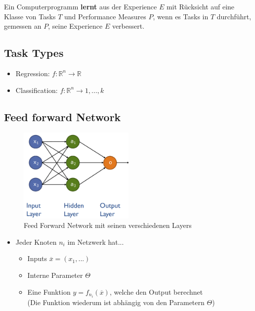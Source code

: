 \documentclass[a4paper]{article}
\begin{document}
		Ein Computerprogramm \textbf{lernt} aus der Experience $E$ mit Rücksicht auf eine Klasse von Tasks $T$ und Performance Measures $P$, wenn es Tasks in $T$ durchführt, gemessen an $P$, seine Experience $E$ verbessert.
		
		\subsection{Task Types}
		
		\begin{itemize}
			\item Regression: $f : \mathbb{R}^{n} \rightarrow \mathbb{R}$ \\
			\item Classification: $f : \mathbb{R}^{n} \rightarrow {1,...,k}$
		\end{itemize}
	
		\subsection{Feed forward Network}
		
		\begin{figure}[htb!]
			\centering
			\includegraphics[width=0.5\textwidth]{img/05_neuronal_networks/feed_forward_network.png}
			\caption{Feed Forward Network mit seinen verschiedenen Layers}
			\label{fig:05_neuronet_ff_network}
		\end{figure}
	
		\begin{itemize}
			\item Jeder Knoten $n_{i}$ im Netzwerk hat...
				\begin{itemize}
					\item Inputs $\overline{x} = (x_{1}, ...)$
					\item Interne Parameter $\Theta$
					\item Eine Funktion $y = f_{n_{i}}(\overline{x})$, welche den Output berechnet \\
					(Die Funktion wiederum ist abhängig von den Parametern $\Theta$)
				\end{itemize}
		\end{itemize}
	
\end{document}
